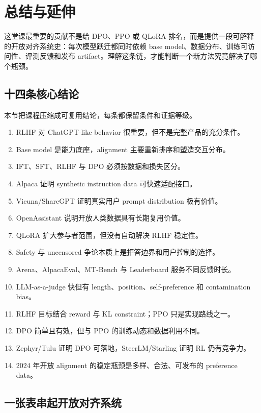 \section{总结与延伸}

这堂课最重要的贡献不是给 DPO、PPO 或 QLoRA 排名，而是提供一段可解释的开放对齐系统史：每次模型跃迁都同时依赖 base model、数据分布、训练可访问性、评测反馈和发布 artifact。理解这条链，才能判断一个新方法究竟解决了哪个瓶颈。

\subsection{十四条核心结论}

本节把课程压缩成可复用结论，每条都保留条件和证据等级。

\begin{enumerate}
  \item RLHF 对 ChatGPT-like behavior 很重要，但不是完整产品的充分条件。
  \item Base model 是能力底座，alignment 主要重新排序和塑造交互分布。
  \item IFT、SFT、RLHF 与 DPO 必须按数据和损失区分。
  \item Alpaca 证明 synthetic instruction data 可快速适配接口。
  \item Vicuna/ShareGPT 证明真实用户 prompt distribution 极有价值。
  \item OpenAssistant 说明开放人类数据具有长期复用价值。
  \item QLoRA 扩大参与者范围，但没有自动解决 RLHF 稳定性。
  \item Safety 与 uncensored 争论本质上是拒答边界和用户控制的选择。
  \item Arena、AlpacaEval、MT-Bench 与 Leaderboard 服务不同反馈时长。
  \item LLM-as-a-judge 快但有 length、position、self-preference 和 contamination bias。
  \item RLHF 目标结合 reward 与 KL constraint；PPO 只是实现路线之一。
  \item DPO 简单且有效，但与 PPO 的训练动态和数据利用不同。
  \item Zephyr/Tulu 证明 DPO 可落地，SteerLM/Starling 证明 RL 仍有竞争力。
  \item 2024 年开放 alignment 的稳定瓶颈是多样、合法、可发布的 preference data。
\end{enumerate}

\subsection{一张表串起开放对齐系统}

